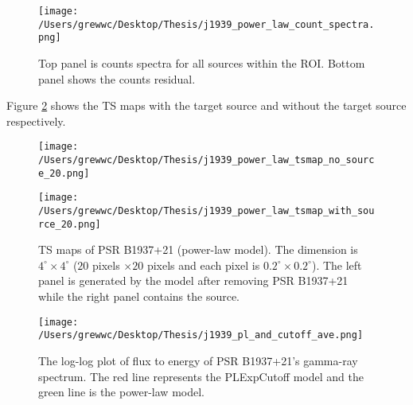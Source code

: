 \documentclass[12pt]{report}
\begin{document}
            \begin{figure}
              \centering 
              \texttt{[image: /Users/grewwc/Desktop/Thesis/j1939\_power\_law\_count\_spectra.png]}
              \caption{Top panel is counts spectra for all sources within the ROI. Bottom panel  
                shows the counts residual. }
              \label{fig: j1939_power_law_count_spectra}
            \end{figure}

            Figure \ref{fig: j1939_power_law_tsmap_withsource_20} shows the TS maps with the 
            target source and without the target source respectively. 

            \begin{figure}[!htp]
              \begin{center}
              \begin{minipage}{0.45\textwidth}
                \begin{center} 
                  \texttt{[image: /Users/grewwc/Desktop/Thesis/j1939\_power\_law\_tsmap\_no\_source\_20.png]}
                \end{center}
              \end{minipage}
              \begin{minipage}{0.45\textwidth}
                \begin{center}
                  \texttt{[image: /Users/grewwc/Desktop/Thesis/j1939\_power\_law\_tsmap\_with\_source\_20.png]}
                \end{center}
              \end{minipage}
            \end{center}
 
            \caption{TS maps of PSR B1937+21 (power-law model). The dimension is $4^{\circ} \times 4^{\circ}$
              ($20$ pixels $\times 20$ pixels and each pixel is 
              $0.2^{\circ} \times 0.2^{\circ}$). The left panel is generated by the model 
              after removing PSR B1937+21 while the right panel contains the source.}
            \label{fig: j1939_power_law_tsmap_withsource_20}
          \end{figure}

          \begin{figure}[!htp]
            \centering
            \texttt{[image: /Users/grewwc/Desktop/Thesis/j1939\_pl\_and\_cutoff\_ave.png]}
            \caption{The log-log plot of flux to energy of PSR B1937+21’s gamma-ray spectrum.
              The red line represents the PLExpCutoff model and the green line is the power-law
              model. }
            \label{fig: j1939_pl_and_cutoff_ave}
          \end{figure}
\end{document}
